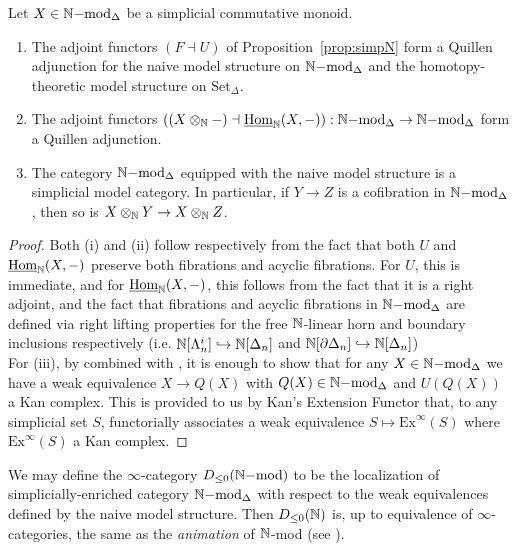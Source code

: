 \begin{proposition}\label{prop:hosimpN}
Let $X \in {\mathbb{N}\mathrm{-mod}}_{\Delta}$ be a simplicial commutative monoid.
\begin{enumerate}
\item[(i)] The adjoint functors $(F \dashv U)$ of Proposition~\ref{prop:simpN} form a Quillen adjunction for the naive model 
structure on ${\mathbb{N}\mathrm{-mod}}_{\Delta}$ and the homotopy-theoretic model structure on $\text{Set}_{\Delta}$. 
\item[(ii)] The adjoint functors $((X \otimes_{\mathbb{N}} -) \dashv \underline{\operatorname{Hom}}_{\mathbb{N}}(X,-)) : {\mathbb{N}\mathrm{-mod}}_{\Delta} \rightarrow {\mathbb{N}\mathrm{-mod}}_{\Delta}$ 
form a Quillen adjunction.
\item[(iii)] The category ${\mathbb{N}\mathrm{-mod}}_{\Delta}$ equipped with the naive model structure is a simplicial model category. 
In particular, if $Y \to Z$ is a cofibration in ${\mathbb{N}\mathrm{-mod}}_{\Delta}$, then so is $X \otimes_{\mathbb{N}} Y \rightarrow X \otimes_{\mathbb{N}} Z$.
\end{enumerate}
\end{proposition}
\begin{proof}
Both (i) and (ii) follow respectively from the fact that both $U$ and $\underline{\operatorname{Hom}}_{\mathbb{N}}(X,-)$ preserve both fibrations and acyclic fibrations. For $U$, 
this is immediate, and for $\underline{\operatorname{Hom}}_{\mathbb{N}}(X,-)$, this follows from the fact that it is a right adjoint, and the fact that fibrations and acyclic fibrations in ${\mathbb{N}\mathrm{-mod}}_{\Delta}$ are defined
via right lifting properties for the free $\mathbb{N}$-linear horn and boundary inclusions respectively (i.e. $\mathbb{N}[\Lambda^i_n] \hookrightarrow \mathbb{N}[\Delta_n]$ 
and $\mathbb{N}[\partial \Delta_n] \hookrightarrow \mathbb{N}[\Delta_n]$)\\
\indent For (iii), by \cite[Theorem II.5.1]{simpho} combined with \cite[Lemma II.6.1]{simpho}, it is enough to show that for any $X \in {\mathbb{N}\mathrm{-mod}}_{\Delta}$ 
we have a weak equivalence $X \to Q(X)$ with $Q(X) \in {\mathbb{N}\mathrm{-mod}}_{\Delta}$ and $U(Q(X))$ a Kan complex. This is provided to us by Kan's Extension Functor
that, to any simplicial set $S$, functorially associates a weak equivalence $S \mapsto \text{Ex}^{\infty}(S)$ where $\text{Ex}^{\infty}(S)$ a Kan complex.
\end{proof}
\begin{remark}
We may define the $\infty$-category $D_{\le 0}(\mathbb{N}\mathrm{-mod})$ to be the localization of simplicially-enriched category ${\mathbb{N}\mathrm{-mod}}_{\Delta}$ 
with respect to the weak equivalences defined by the naive model structure. Then $D_{\le 0}(\mathbb{N})$ is, up to 
equivalence of $\infty$-categories, the same as the \textit{animation} of $\mathbb{N}$-mod (see \cite[5.5.9.3]{htt}).
\end{remark}\label{rem:comptop}
